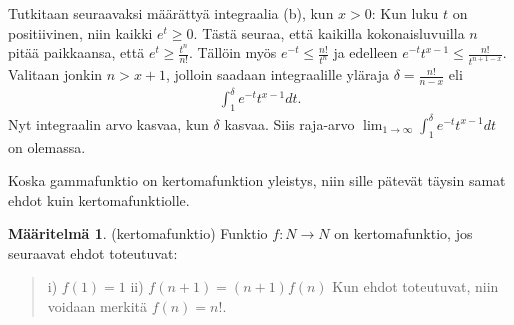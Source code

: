 \documentclass[12pt]{article}
\theoremstyle{definition}
\newtheorem{maar}{Määritelmä}
\theoremstyle{plain}
\begin{document}
Tutkitaan seuraavaksi määrättyä integraalia (b), kun $x>0$: \newline
Kun luku $t$ on positiivinen, niin kaikki $e^t\ge0$. Tästä seuraa, että kaikilla kokonaisluvuilla $n$ pitää paikkaansa, että $e^t\ge\frac{t^n}{n!}$. Tällöin myös $e^{-t}\le\frac{n!}{t^n}$ ja edelleen $e^{-t}t^{x-1}\le\frac{n!}{t^{n+1-x}}$. Valitaan jonkin $n>x+1$, jolloin saadaan integraalille yläraja $\delta=\frac{n!}{n-x}$ eli
\begin{align*}
    \int_1^{\delta}e^{-t}t^{x-1}dt.
\end{align*}
Nyt integraalin arvo kasvaa, kun $\delta$ kasvaa. Siis raja-arvo $\lim_{1\to\infty}\int_1^{\delta}e^{-t}t^{x-1}dt$ on olemassa.\newline

Koska gammafunktio on kertomafunktion yleistys, niin sille pätevät täysin samat ehdot kuin kertomafunktiolle. 

\begin{maar}
(kertomafunktio)
Funktio $f: N \rightarrow N$ on kertomafunktio, jos seuraavat ehdot toteutuvat:
\begin{quote}
    i) $f(1)=1$ \newline
    ii) $f(n+1)=(n+1)f(n)$ \newline
    Kun ehdot toteutuvat, niin voidaan merkitä $f(n)=n!$.
\end{quote}
\end{maar}
\end{document}
